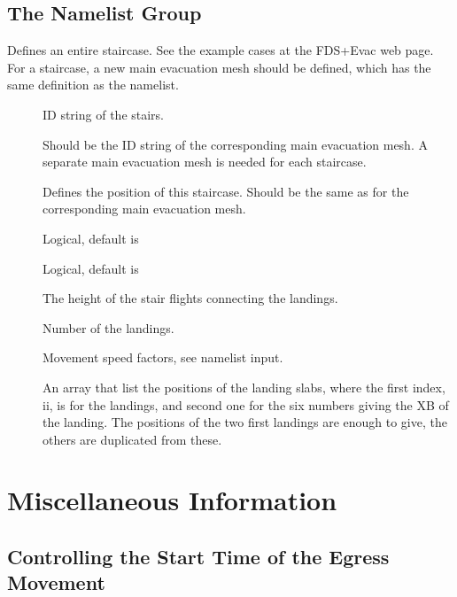 \documentclass[12pt,a4paper,final,twoside]{stylevk}
\begin{document}
\section{The  Namelist Group}\label{Sec_StrsNML}

\noindent Defines an entire staircase.  See the example cases at the
FDS+Evac web page.  For a  staircase, a new main
evacuation mesh should be defined, which has the same 
definition as the  namelist.


\begin{description}
%
%
\item[] ID string of the stairs.
%
\item[] Should be the ID string of the corresponding
  main evacuation mesh.  A separate main evacuation mesh is needed for
  each  staircase.
%
\item[] Defines the position of this staircase.  Should be
  the same as for the corresponding main evacuation mesh.
%
\item[] Logical, default is 
%
\item[] Logical, default is 
%
\item[] The height of the stair
  flights connecting the landings.
%
\item[] Number of the landings.
%
\item[] Movement
  speed factors, see  namelist input.
%
\item[] An array that list the positions of
  the landing slabs, where the first index, ii, is for the landings,
  and second one for the six numbers giving the XB of the landing.
  The positions of the two first landings are enough to give, the
  others are duplicated from these.
%
%
\end{description}
%

\clearpage

\newpage

\chapter{Miscellaneous Information}\label{Sec_MiscInfo}


\section{Controlling the Start Time of the Egress
  Movement}\label{Sec_TdetTpre} 
\end{document}
